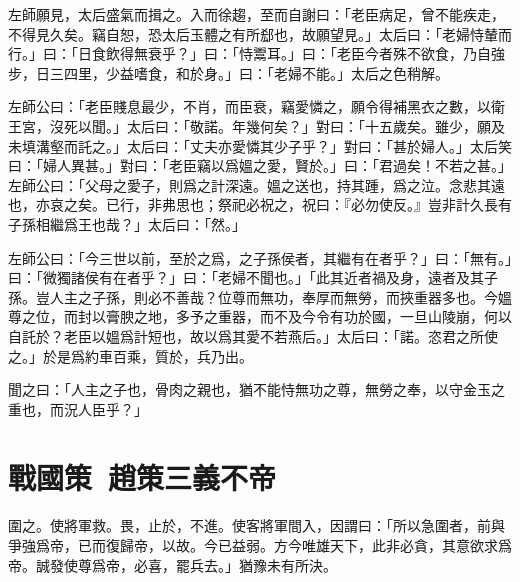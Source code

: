 左師願見，太后盛氣而揖之。入而徐趨，至而自謝曰：「老臣病足，曾不能疾走，不得見久矣。竊自恕，恐太后玉體之有所郄也，故願望見。」太后曰：「老婦恃輦而行。」曰：「日食飲得無衰乎？」曰：「恃鬻耳。」曰：「老臣今者殊不欲食，乃自強步，日三四里，少益嗜食，和於身。」曰：「老婦不能。」太后之色稍解。

左師公曰：「老臣賤息最少，不肖，而臣衰，竊愛憐之，願令得補黑衣之數，以衛王宮，沒死以聞。」太后曰：「敬諾。年幾何矣？」對曰：「十五歲矣。雖少，願及未填溝壑而託之。」太后曰：「丈夫亦愛憐其少子乎？」對曰：「甚於婦人。」太后笑曰：「婦人異甚。」對曰：「老臣竊以爲媼之愛，賢於。」曰：「君過矣！不若之甚。」左師公曰：「父母之愛子，則爲之計深遠。媼之送也，持其踵，爲之泣。念悲其遠也，亦哀之矣。已行，非弗思也；祭祀必祝之，祝曰：『必勿使反。』豈非計久長有子孫相繼爲王也哉？」太后曰：「然。」

左師公曰：「今三世以前，至於之爲，之子孫侯者，其繼有在者乎？」曰：「無有。」曰：「微獨諸侯有在者乎？」曰：「老婦不聞也。」「此其近者禍及身，遠者及其子孫。豈人主之子孫，則必不善哉？位尊而無功，奉厚而無勞，而挾重器多也。今媼尊之位，而封以膏腴之地，多予之重器，而不及今令有功於國，一旦山陵崩，何以自託於？老臣以媼爲計短也，故以爲其愛不若燕后。」太后曰：「諾。恣君之所使之。」於是爲約車百乘，質於，兵乃出。

聞之曰：「人主之子也，骨肉之親也，猶不能恃無功之尊，無勞之奉，以守金玉之重也，而況人臣乎？」

\section[魯仲連義不帝秦\quad{\small 戰國策\ 趙策三}]{{\normalsize 戰國策\ 趙策三}\quad {}義不帝}
圍之。使將軍救。畏，止於，不進。使客將軍間入，因謂曰：「所以急圍者，前與爭強爲帝，已而復歸帝，以故。今已益弱。方今唯雄天下，此非必貪，其意欲求爲帝。誠發使尊爲帝，必喜，罷兵去。」猶豫未有所決。

